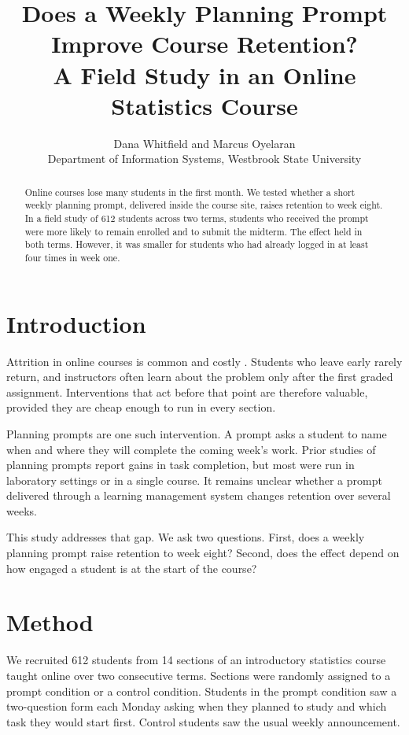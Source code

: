 \documentclass[11pt]{article}
\title{Does a Weekly Planning Prompt Improve Course Retention?\\A Field Study in an Online Statistics Course}
\author{Dana Whitfield and Marcus Oyelaran\\Department of Information Systems, Westbrook State University}
\date{}
\begin{document}
\maketitle

\begin{abstract}
Online courses lose many students in the first month. We tested whether a short weekly planning prompt, delivered inside the course site, raises retention to week eight. In a field study of 612 students across two terms, students who received the prompt were more likely to remain enrolled and to submit the midterm. The effect held in both terms. However, it was smaller for students who had already logged in at least four times in week one.
\end{abstract}

\section{Introduction}
Attrition in online courses is common and costly \citep{davis1989}. Students who leave early rarely return, and instructors often learn about the problem only after the first graded assignment. Interventions that act before that point are therefore valuable, provided they are cheap enough to run in every section.

Planning prompts are one such intervention. A prompt asks a student to name when and where they will complete the coming week's work. Prior studies of planning prompts report gains in task completion, but most were run in laboratory settings or in a single course. It remains unclear whether a prompt delivered through a learning management system changes retention over several weeks.

This study addresses that gap. We ask two questions. First, does a weekly planning prompt raise retention to week eight? Second, does the effect depend on how engaged a student is at the start of the course?

\section{Method}
We recruited 612 students from 14 sections of an introductory statistics course taught online over two consecutive terms. Sections were randomly assigned to a prompt condition or a control condition. Students in the prompt condition saw a two-question form each Monday asking when they planned to study and which task they would start first. Control students saw the usual weekly announcement.
\end{document}
